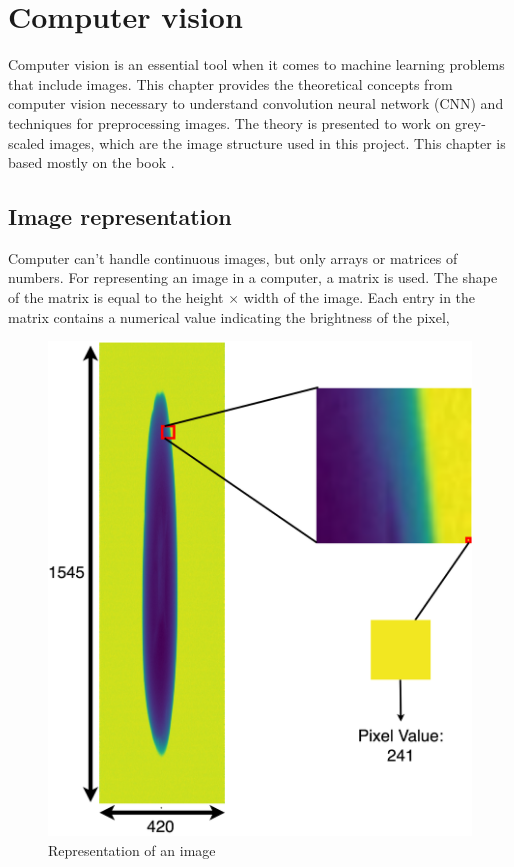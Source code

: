\documentclass[11pt]{article}
\begin{document}
\section{Computer vision}\label{sec:comuter_vision}

Computer vision is an essential tool when it comes to machine learning problems that include images. This chapter provides the theoretical concepts from computer vision necessary to understand convolution neural network (CNN) and techniques for preprocessing images. The theory is presented to work on grey-scaled images, which are the image structure used in this project. This chapter is based mostly on the book \cite{Jahne05}.

\subsection{Image representation}\label{sec:computer_vision_image_reprsentation}


Computer can't handle continuous images, but only arrays or matrices of numbers. For representing an image in a computer, a matrix is used. The shape of the matrix is equal to the height $\times$ width of the image.  Each entry in the matrix contains a numerical value indicating the brightness of the pixel,
\begin{figure}[!h]
    \centering
    \includegraphics[scale=0.10]{figurer/computer_vision/representation.png}
    \caption{Representation of an image}
    \label{fig:computer_vision_image_representation}
\end{figure}
\end{document}
